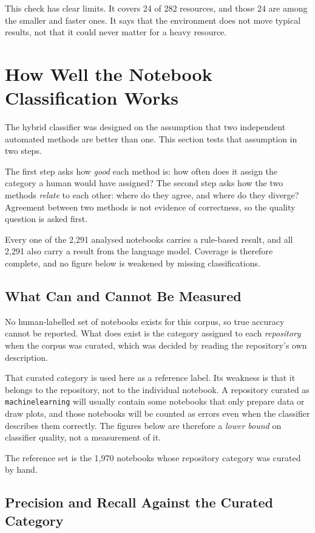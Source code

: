 This check has clear limits. It covers 24 of 282 resources, and those 24 are among the smaller and faster ones. It says that the environment does not move typical results, not that it could never matter for a heavy resource.

\section{How Well the Notebook Classification Works}
\label{sec:eval-classification}

The hybrid classifier was designed on the assumption that two independent automated methods are better than one. This section tests that assumption in two steps.

The first step asks how \emph{good} each method is: how often does it assign the category a human would have assigned? The second step asks how the two methods \emph{relate} to each other: where do they agree, and where do they diverge? Agreement between two methods is not evidence of correctness, so the quality question is asked first.

Every one of the 2{,}291 analysed notebooks carries a rule-based result, and all 2{,}291 also carry a result from the language model. Coverage is therefore complete, and no figure below is weakened by missing classifications.

\subsection{What Can and Cannot Be Measured}

No human-labelled set of notebooks exists for this corpus, so true accuracy cannot be reported. What does exist is the category assigned to each \emph{repository} when the corpus was curated, which was decided by reading the repository's own description.

That curated category is used here as a reference label. Its weakness is that it belongs to the repository, not to the individual notebook. A repository curated as \texttt{machine\ub learning} will usually contain some notebooks that only prepare data or draw plots, and those notebooks will be counted as errors even when the classifier describes them correctly. The figures below are therefore a \emph{lower bound} on classifier quality, not a measurement of it.

The reference set is the 1{,}970 notebooks whose repository category was curated by hand.

\subsection{Precision and Recall Against the Curated Category}

